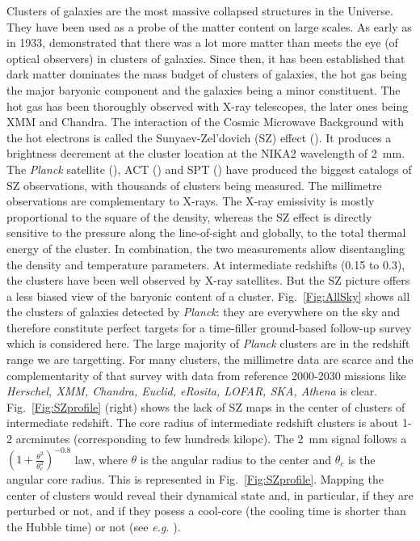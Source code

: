 \documentclass[10pt,a4paper,twoside,graphicx,color]{article}
\begin{document}
\vspace{-0.1cm}  Clusters
of galaxies are the most massive collapsed structures in the
Universe. They have been used as a probe of the matter content on
large scales. As early as in 1933, \cite{Zwicky1933} demonstrated that
there was a lot more matter than meets the eye (of optical observers)
in clusters of galaxies. Since then, it has been established that dark
matter dominates the mass budget of clusters of galaxies, the hot gas
being the major baryonic component and the galaxies being a minor
constituent. The hot gas has been thoroughly observed with X-ray
telescopes, the later ones being XMM and Chandra. The interaction of
the Cosmic Microwave Background with the hot electrons is called the
Sunyaev-Zel'dovich (SZ) effect (\cite{SZ1972}). It produces a
brightness decrement at the cluster location at the NIKA2 wavelength
of 2~mm.  The {\sl Planck} satellite (\cite{PSZ2}), ACT
(\cite{Hasselfield2013}) and SPT (\cite{Bleem2014}) have produced the
biggest catalogs of SZ observations, with thousands of clusters being
measured. The millimetre observations are complementary to X-rays. The
X-ray emissivity is mostly proportional to the square of the density,
whereas the SZ effect is directly sensitive to the pressure along the
line-of-sight and globally, to the total thermal energy of the
cluster. In combination, the two measurements allow disentangling the
density and temperature parameters. At intermediate redshifts (0.15 to
0.3), the clusters have been well observed by X-ray satellites. But
the SZ picture offers a less biased view of the baryonic content of a
cluster. 
Fig.~\ref{Fig:AllSky} shows all the clusters of galaxies detected by
{\sl Planck}: they are everywhere on the sky and therefore constitute
perfect targets for a time-filler ground-based follow-up survey which
is considered here. The large majority of {\sl Planck} clusters are in
the redshift range we are targetting. For many clusters, the
millimetre data are scarce and the complementarity of that survey with
data from reference 2000-2030 missions like {\sl Herschel, XMM,
  Chandra, Euclid, eRosita, LOFAR, SKA, Athena} is
clear. Fig.~\ref{Fig:SZprofile} (right) shows the lack of SZ maps in
the center of clusters of intermediate redshift. The core radius of
intermediate redshift clusters is about 1-2 arcminutes (corresponding
to few hundreds kilopc). The 2~mm signal follows a
$(1+\frac{\theta^2}{\theta_c^2 })^{-0.8}$ law, where $\theta$ is the
angular radius to the center and $\theta_c$ is the angular core
radius. This is represented in Fig.~\ref{Fig:SZprofile}. Mapping the
center of clusters would reveal their dynamical state and, in
particular, if they are perturbed or not, and if they posess a
cool-core (the cooling time is shorter than the Hubble time) or not
(see {\sl e.g.} \cite{Hudson2010}). \\
\end{document}
